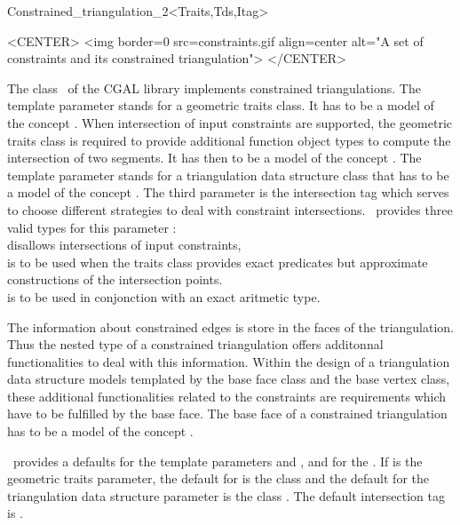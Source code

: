 \begin{ccRefClass}{Constrained_triangulation_2<Traits,Tds,Itag>}
\begin{ccTexOnly}
\begin{center}   \end{center}
\end{ccTexOnly}

\begin{ccHtmlOnly}
<CENTER>
<img border=0 src=constraints.gif align=center alt="A set of
constraints and its constrained triangulation">
</CENTER>
\end{ccHtmlOnly}

The class \ccRefName\ of the CGAL library
implements constrained triangulations.
The template parameter  
stands for a geometric traits class. It has to be a model
of the concept .
When intersection of input constraints are supported, 
the geometric traits class 
is required to provide additional function object  types
to compute the intersection of two segments.
It has then to be a model of the concept
.
The template parameter 
stands for 
a triangulation data structure class that has to be a model
of the concept .
The third parameter  is the intersection tag
which serves  to choose different
strategies to deal with constraint intersections. 
\cgal\ provides three valid types for this parameter : \\
 disallows intersections of
 input constraints,\\
 is to be used when the traits
class
provides exact predicates but approximate constructions of the
intersection points.\\
 is to be used in conjonction
with an exact aritmetic type.

 The information about constrained edges is store in the 
faces of the triangulation. Thus the nested 
type of a constrained triangulation offers
additonnal functionalities to deal with this information.
Within the design of a triangulation data structure
models templated by the base face class and the base vertex class,
these additional functionalities related to the constraints
are requirements which have to be fulfilled
by the base face.
The base face of a constrained triangulation
has to be a model of the concept
.


\cgal\ provides a defaults for the template parameters
 and , and for the .
 If  is the geometric traits
parameter,
the default  for
  is the class
and the default for the
triangulation data structure parameter is the class
.
The default intersection tag is .


\end{ccRefClass}
